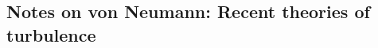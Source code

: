 \documentclass[usenatbib,twocolumn, twocolappendix]{aastex63}
\begin{document}
\begin{appendix}
%

%
%
%
%
%


\section{Notes on von Neumann: Recent theories of turbulence}



\end{appendix}
\end{document}
